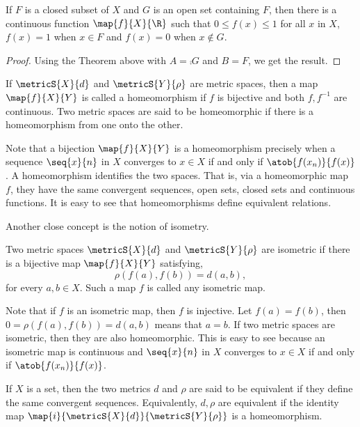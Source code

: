 \begin{Corollary}
    If $F$ is a closed subset of $X$ and $G$ is an open set containing $F$, then there is a continuous
    function $\map{f}{X}{\R}$ such that $0 \leq f(x) \leq 1$ for all $x$ in $X$, $f(x) = 1$ when $x \in F$ and
    $f(x) = 0$ when $x \not \in G$.
\end{Corollary}
\begin{proof}
    Using the Theorem above with $A = \comp{G}$ and $B = F$, we get the result.
\end{proof}
\begin{Definition}[name= Homeomorphism]
    If $\metricS{X}{d}$ and $\metricS{Y}{\rho}$ are metric spaces, then a map $\map{f}{X}{Y}$ is called a 
    homeomorphism if $f$ is bijective and both $f,f^{-1}$ are continuous. Two metric spaces are said to be
    homeomorphic if there is a homeomorphism from one onto the other.
\end{Definition}
\begin{Remark}
    Note that a bijection $\map{f}{X}{Y}$ is a homeomorphism precisely when a sequence $\seq{x}{n}$ in $X$
    converges to $x \in X$ if and only if $\atob{f(x_n)}{f(x)}$. A homeomorphism identifies the two spaces.
    That is, via a homeomorphic map $f$, they have the same convergent sequences, open sets, closed sets and
    continuous functions. It is easy to see that homeomorphisms define equivalent relations.
\end{Remark}
Another close concept is the notion of isometry.
\begin{Definition}[name=Isometry]
    Two metric spaces $\metricS{X}{d}$ and $\metricS{Y}{\rho}$ are isometric if there is a bijective map 
    $\map{f}{X}{Y}$ satisfying,
    \[\rho(f(a),f(b)) = d(a,b),\]
    for every $a,b \in X$. Such a map $f$ is called any isometric map.
\end{Definition}
\begin{Remark}
    Note that if $f$ is an isometric map, then $f$ is injective. Let $f(a) = f(b)$, then
    $0 = \rho(f(a),f(b)) = d(a,b)$ means that $a = b$.
    If two metric spaces are isometric, then they are also homeomorphic. This is easy to see because an
    isometric map is continuous and  $\seq{x}{n}$ in $X$
    converges to $x \in X$ if and only if $\atob{f(x_n)}{f(x)}$.
\end{Remark}
\begin{Definition}[name= Equivalent metrics]
    If $X$ is a set, then the two metrics $d$ and $\rho$ are said to be equivalent if they define the same
    convergent sequences. Equivalently, $d,\rho$ are equivalent if the identity map
    $\map{i}{\metricS{X}{d}}{\metricS{Y}{\rho}}$ is a homeomorphism.
\end{Definition}
